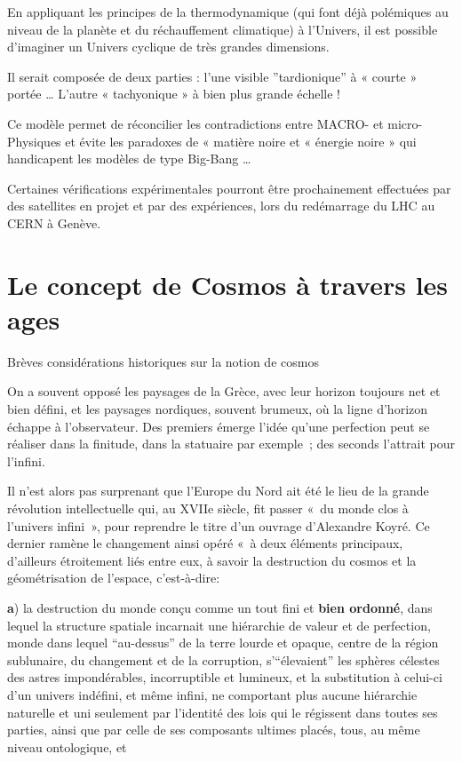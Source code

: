 \documentclass[a4paper,12pt]{article}
\begin{document}
En appliquant les principes de la thermodynamique (qui font déjà polémiques au niveau de la planète et du réchauffement climatique) à l'Univers, il est possible d'imaginer un Univers cyclique de très grandes dimensions.

Il serait composée de deux parties : l'une visible ”tardionique” à « courte » portée … L'autre « tachyonique » à bien plus grande échelle !

Ce modèle permet de réconcilier les contradictions entre MACRO- et micro- Physiques et évite les paradoxes de « matière noire et « énergie noire » qui handicapent les modèles de type Big-Bang …

Certaines vérifications expérimentales pourront être prochainement effectuées par des satellites en projet et par des expériences, lors du redémarrage du LHC au CERN à Genève.









\section{Le concept de Cosmos à travers les ages}

Brèves considérations historiques sur la notion de cosmos

On a souvent opposé les paysages de la Grèce, avec leur horizon toujours net et bien défini, et les paysages nordiques, souvent brumeux, où la ligne d'horizon échappe à l'observateur. Des premiers émerge l'idée qu'une perfection peut se réaliser dans la finitude, dans la statuaire par exemple ; des seconds l'attrait pour l'infini. 

Il n'est alors pas surprenant que l'Europe du Nord ait été le lieu de la grande révolution intellectuelle qui, au XVIIe siècle, fit passer « du monde clos à l'univers infini », pour reprendre le titre d'un ouvrage d'Alexandre Koyré. Ce dernier ramène le changement ainsi opéré « à deux éléments principaux, d'ailleurs étroitement liés entre eux, à savoir la destruction du cosmos et la géométrisation de l'espace, c'est-à-dire:

\textbf{a}) la destruction du monde conçu comme un tout fini et  \textbf{bien ordonné}, dans lequel la structure spatiale incarnait une hiérarchie de valeur et de perfection, monde dans lequel “au-dessus” de la terre lourde et opaque, centre de la région sublunaire, du changement et de la corruption, s'“élevaient” les sphères célestes des astres impondérables, incorruptible et lumineux, et la substitution à celui-ci d'un univers indéfini, et même infini, ne comportant plus aucune hiérarchie naturelle et uni seulement par l'identité des lois qui le régissent dans toutes ses parties, ainsi que par celle de ses composants ultimes placés, tous, au même niveau ontologique, et 
\end{document}
